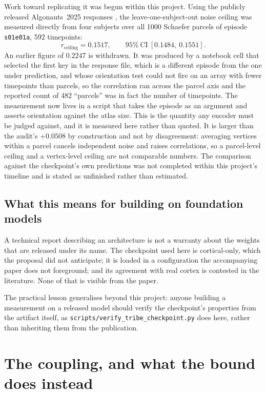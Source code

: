 Work toward replicating it was begun within this project. Using the publicly released
Algonauts~2025 responses \cite{algonauts2025}, the leave-one-subject-out noise ceiling was
measured directly from four subjects over all 1000 Schaefer parcels \cite{schaefer2018} of
episode \texttt{s01e01a}, 592 timepoints:
\begin{equation}
r_{\text{ceiling}} = 0.1517, \qquad 95\%\ \text{CI}\ [0.1484,\ 0.1551].
\end{equation}
An earlier figure of $0.2247$ is withdrawn. It was produced by a notebook cell that selected
the first key in the response file, which is a different episode from the one under
prediction, and whose orientation test could not fire on an array with fewer timepoints than
parcels, so the correlation ran across the parcel axis and the reported count of 482
``parcels'' was in fact the number of timepoints. The measurement now lives in a script that
takes the episode as an argument and asserts orientation against the atlas size.
This is the quantity any encoder must be judged against, and it is measured here rather than
quoted. It is larger than the audit's $+0.0508$ by construction and not by disagreement:
averaging vertices within a parcel cancels independent noise and raises correlations, so a
parcel-level ceiling and a vertex-level ceiling are not comparable numbers. The comparison
against the checkpoint's own predictions was not completed within this project's timeline and
is stated as unfinished rather than estimated.

\subsection{What this means for building on foundation models}

A technical report describing an architecture is not a warranty about the weights that are
released under its name. The checkpoint used here is cortical-only, which the proposal did
not anticipate; it is loaded in a configuration the accompanying paper does not foreground;
and its agreement with real cortex is contested in the literature. None of that is visible
from the paper.

The practical lesson generalises beyond this project: anyone building a measurement on a
released model should verify the checkpoint's properties from the artifact itself, as
\texttt{scripts/verify\_tribe\_checkpoint.py} does here, rather than inheriting them from the
publication.

\section{The coupling, and what the bound does instead}

